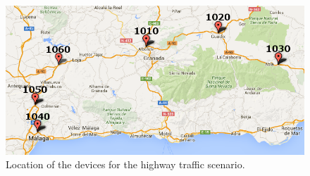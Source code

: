 \documentclass[preprint]{elsarticle}
\begin{document}
\begin{figure}[htb]
	\begin{center}
		\includegraphics[scale=0.4]{imgs/nodos_dgt.png}
		\caption{Location of the devices for the highway traffic scenario.}
	\label{fig:nodosDGT}
	\end{center}
\end{figure}

\end{document}
